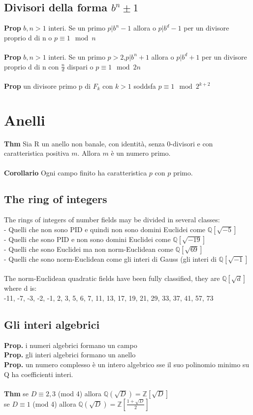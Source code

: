 \documentclass[10pt,a4paper]{article}
\begin{document}
\subsection{Divisori della forma $b^n \pm 1$}
\textbf{Prop} $b,n>1$ interi. Se un primo $p | b^n-1$ allora o $p|b^d-1$ per un divisore proprio d di n o $p\equiv 1 \mod n$\\\\
\textbf{Prop} $b,n>1$ interi. Se un primo $p>2$,$p | b^n+1$ allora o $p|b^d+1$ per un divisore proprio d di n con $\frac{n}{d}$ dispari o $p\equiv 1 \mod 2n$\\\\
\textbf{Prop} un divisore primo p di $F_k$ con $k>1$ soddsfa $p\equiv 1 \mod 2^{k+2}$
\newpage
\section{Anelli}
\textbf{Thm} Sia R un anello non banale, con identità, senza 0-divisori e con caratteristica positiva $m$. Allora $m$ è un numero primo.\\\\
\textbf{Corollario} Ogni campo finito ha caratteristica $p$ con $p$ primo.
\subsection{The ring of integers}
The rings of integers of number fields may be divided in several classes:\\
- Quelli che non sono PID e quindi non sono domini Euclidei come $\mathbb{Q}[\sqrt{-5}]$\\
- Quelli che sono PID e non sono domini Euclidei come $\mathbb{Q}[\sqrt{-19}]$\\
- Quelli che sono Euclidei ma non norm-Euclidean come $\mathbb{Q}[\sqrt{69}]$\\
- Quelli che sono norm-Euclidean come gli interi di Gauss (gli interi di $\mathbb{Q}[\sqrt{-1}]$\\\\
The norm-Euclidean quadratic fields have been fully classified, they are $\mathbb{Q}[\sqrt{d}]$ where d is:\\
-11, -7, -3, -2, -1, 2, 3, 5, 6, 7, 11, 13, 17, 19, 21, 29, 33, 37, 41, 57, 73
\subsection{Gli interi algebrici}
\textbf{Prop.} i numeri algebrici formano un campo\\
\textbf{Prop.} gli interi algebrici formano un anello\\
\textbf{Prop.} un numero complesso è un intero algebrico sse il suo polinomio minimo su Q ha coefficienti interi.\\\\
\textbf{Thm} se $D \equiv 2,3$ (mod 4) allora $\mathbb{Q}(\sqrt D) = \mathbb{Z}[\sqrt D]$\\
se $D \equiv 1$ (mod 4) allora $\mathbb{Q}(\sqrt D) = \mathbb{Z}[\frac{1+ \sqrt D}{2}]$
\end{document}
